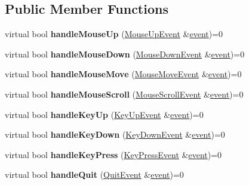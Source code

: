 \subsection*{Public Member Functions}
\begin{DoxyCompactItemize}
\item 
\hypertarget{structEventHandler_a31b9dcd55c5bddebb875765576255e90}{virtual bool {\bfseries handle\+Mouse\+Up} (\hyperlink{structMouseUpEvent}{Mouse\+Up\+Event} \&\hyperlink{unionSDL__Event}{event})=0}\label{structEventHandler_a31b9dcd55c5bddebb875765576255e90}

\item 
\hypertarget{structEventHandler_a4a3f362f4dbc700af1fad213131c7e0e}{virtual bool {\bfseries handle\+Mouse\+Down} (\hyperlink{structMouseDownEvent}{Mouse\+Down\+Event} \&\hyperlink{unionSDL__Event}{event})=0}\label{structEventHandler_a4a3f362f4dbc700af1fad213131c7e0e}

\item 
\hypertarget{structEventHandler_a62e75bc38f855bc1d7f677225f601345}{virtual bool {\bfseries handle\+Mouse\+Move} (\hyperlink{structMouseMoveEvent}{Mouse\+Move\+Event} \&\hyperlink{unionSDL__Event}{event})=0}\label{structEventHandler_a62e75bc38f855bc1d7f677225f601345}

\item 
\hypertarget{structEventHandler_a7fa1d4c71f4f97a12c1203676bb50f9f}{virtual bool {\bfseries handle\+Mouse\+Scroll} (\hyperlink{structMouseScrollEvent}{Mouse\+Scroll\+Event} \&\hyperlink{unionSDL__Event}{event})=0}\label{structEventHandler_a7fa1d4c71f4f97a12c1203676bb50f9f}

\item 
\hypertarget{structEventHandler_af209b5af92d670e20a3c4b6acf8c32e3}{virtual bool {\bfseries handle\+Key\+Up} (\hyperlink{classKeyUpEvent}{Key\+Up\+Event} \&\hyperlink{unionSDL__Event}{event})=0}\label{structEventHandler_af209b5af92d670e20a3c4b6acf8c32e3}

\item 
\hypertarget{structEventHandler_affc191abd86c8cdd3290a4b9229a4c2f}{virtual bool {\bfseries handle\+Key\+Down} (\hyperlink{classKeyDownEvent}{Key\+Down\+Event} \&\hyperlink{unionSDL__Event}{event})=0}\label{structEventHandler_affc191abd86c8cdd3290a4b9229a4c2f}

\item 
\hypertarget{structEventHandler_a2db8a056203bd5a6c2f2d7045dd0dcf9}{virtual bool {\bfseries handle\+Key\+Press} (\hyperlink{structKeyPressEvent}{Key\+Press\+Event} \&\hyperlink{unionSDL__Event}{event})=0}\label{structEventHandler_a2db8a056203bd5a6c2f2d7045dd0dcf9}

\item 
\hypertarget{structEventHandler_a7edb38ef218c53ccfe5a9e17a78e865d}{virtual bool {\bfseries handle\+Quit} (\hyperlink{structQuitEvent}{Quit\+Event} \&\hyperlink{unionSDL__Event}{event})=0}\label{structEventHandler_a7edb38ef218c53ccfe5a9e17a78e865d}

\end{DoxyCompactItemize}


